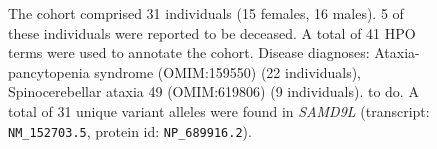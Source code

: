 \begin{figure}[htbp]
\vspace{2em}

\caption{ The cohort comprised 31 individuals (15 females, 16 males). 5 of these individuals were reported to be deceased. A total of 41 HPO terms were used to annotate the cohort. Disease diagnoses: Ataxia-pancytopenia syndrome (OMIM:159550) (22 individuals), Spinocerebellar ataxia 49 (OMIM:619806) (9 individuals). to do. A total of 31 unique variant alleles were found in \textit{SAMD9L} (transcript: \texttt{NM\_152703.5}, protein id: \texttt{NP\_689916.2}).}
\end{figure}
